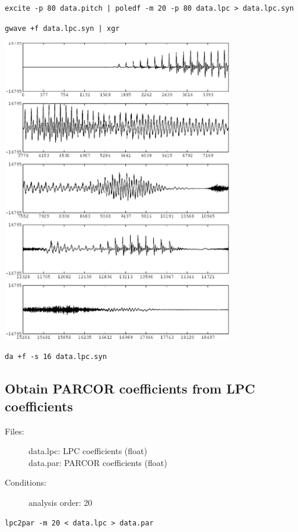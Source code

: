 \documentclass[a4paper,10pt]{article}
\begin{document}
\begin{verbatim}
excite -p 80 data.pitch | poledf -m 20 -p 80 data.lpc > data.lpc.syn
\end{verbatim}

\begin{verbatim}
gwave +f data.lpc.syn | xgr
\end{verbatim}

\includegraphics[width=10cm]{eps/data.lpc.syn.gwave.eps}

\begin{verbatim}
da +f -s 16 data.lpc.syn
\end{verbatim}

\subsection{Obtain PARCOR coefficients from LPC coefficients}

\begin{description}
\item[Files:] 
   data.lpc: LPC coefficients (float)\\
   data.par: PARCOR coefficients (float)
\item[Conditions:]
  analysis order: 20
\end{description}

\begin{verbatim}
lpc2par -m 20 < data.lpc > data.par
\end{verbatim}
\end{document}
